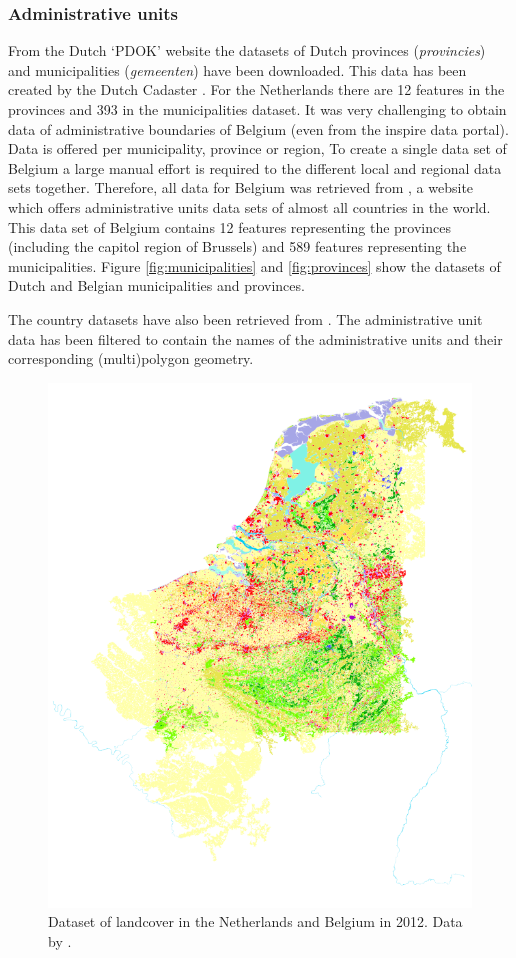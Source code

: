 \subsubsection{Administrative units}
\begin{sloppypar}
	From the Dutch `PDOK' website the datasets of Dutch provinces (\textit{provincies}) and municipalities (\textit{gemeenten}) have been downloaded. This data has been created by the Dutch Cadaster \citep{DATA:Kadaster}. For the Netherlands there are 12 features in the provinces and 393 in the municipalities dataset. It was very challenging to obtain data of administrative boundaries of Belgium (even from the \ac{inspire} data portal). Data is offered per municipality, province or region, To create a single  data set of Belgium a large manual effort is required to the different local and regional data sets together. Therefore, all data for Belgium was retrieved from \cite{DATA:GADM}, a website which offers administrative units data sets of almost all countries in the world. This data set of Belgium contains 12 features representing the provinces (including the capitol region of Brussels) and 589 features representing the municipalities. Figure \ref{fig:municipalities} and \ref{fig:provinces} show the datasets of Dutch and Belgian municipalities and provinces.  
	
	The country datasets have also been retrieved from \cite{DATA:GADM}. The administrative unit data has been filtered to contain the names of the administrative units and their corresponding (multi)polygon geometry. 
\end{sloppypar}

\begin{figure}
	\centering
	\includegraphics[width=0.9\linewidth]{figs/CORINE_NL_BE_color.PNG}
	\caption{Dataset of landcover in the Netherlands and Belgium in 2012. Data by \cite{DATA:CLC}.}
	\label{fig:CORINE}
\end{figure}


